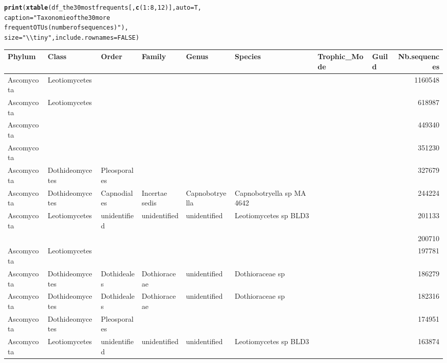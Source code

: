 \documentclass[12pt]{article}\usepackage[]{graphicx}\usepackage[]{color}
\makeatletter
\newcommand{\hlnum}[1]{\textcolor[rgb]{0.686,0.059,0.569}{#1}}%
\newcommand{\hlstr}[1]{\textcolor[rgb]{0.192,0.494,0.8}{#1}}%
\newcommand{\hlopt}[1]{\textcolor[rgb]{0,0,0}{#1}}%
\newcommand{\hlstd}[1]{\textcolor[rgb]{0.345,0.345,0.345}{#1}}%
\newcommand{\hlkwc}[1]{\textcolor[rgb]{0.333,0.667,0.333}{#1}}%
\newcommand{\hlkwd}[1]{\textcolor[rgb]{0.737,0.353,0.396}{\textbf{#1}}}%
\newenvironment{kframe}{%
 \def\at@end@of@kframe{}%
 \ifinner\ifhmode%
  \def\at@end@of@kframe{\end{minipage}}%
  \begin{minipage}{\columnwidth}%
 \fi\fi%
 \def\FrameCommand##1{\hskip\@totalleftmargin \hskip-\fboxsep
 \colorbox{shadecolor}{##1}\hskip-\fboxsep
     \hskip-\linewidth \hskip-\@totalleftmargin \hskip\columnwidth}%
 \MakeFramed {\advance\hsize-\width
   \@totalleftmargin\z@ \linewidth\hsize
   \@setminipage}}%
 {\par\unskip\endMakeFramed%
 \at@end@of@kframe}
\numberwithin{figure}{section}
\makeatother
\begin{document}
\begin{landscape}
\begin{kframe}
\begin{alltt}
\hlkwd{print}\hlstd{(}\hlkwd{xtable}\hlstd{(df_the30mostfrequents[,} \hlkwd{c}\hlstd{(}\hlnum{1}\hlopt{:}\hlnum{8}\hlstd{,} \hlnum{12}\hlstd{)],} \hlkwc{auto} \hlstd{= T,}
             \hlkwc{caption} \hlstd{=} \hlstr{"Taxonomie of the 30 more
             frequent OTUs (number of sequences)"}\hlstd{),}
      \hlkwc{size} \hlstd{=} \hlstr{"\textbackslash{}\textbackslash{}tiny"}\hlstd{,} \hlkwc{include.rownames} \hlstd{=} \hlnum{FALSE}\hlstd{)}
\end{alltt}
\end{kframe}%
\begin{table}[ht]
\centering
\begingroup\tiny
\begin{tabular}{llllllllr}
  \hline
Phylum & Class & Order & Family & Genus & Species & Trophic\_Mode & Guild & Nb.sequences \\ 
  \hline
Ascomycota & Leotiomycetes &  &  &  &  &  &  & 1160548 \\ 
  Ascomycota & Leotiomycetes &  &  &  &  &  &  & 618987 \\ 
  Ascomycota &  &  &  &  &  &  &  & 449340 \\ 
  Ascomycota &  &  &  &  &  &  &  & 351230 \\ 
  Ascomycota & Dothideomycetes & Pleosporales &  &  &  &  &  & 327679 \\ 
  Ascomycota & Dothideomycetes & Capnodiales & Incertae sedis & Capnobotryella & Capnobotryella sp MA 4642 &  &  & 244224 \\ 
  Ascomycota & Leotiomycetes & unidentified & unidentified & unidentified & Leotiomycetes sp BLD3 &  &  & 201133 \\ 
   &  &  &  &  &  &  &  & 200710 \\ 
  Ascomycota & Leotiomycetes &  &  &  &  &  &  & 197781 \\ 
  Ascomycota & Dothideomycetes & Dothideales & Dothioraceae & unidentified & Dothioraceae sp &  &  & 186279 \\ 
  Ascomycota & Dothideomycetes & Dothideales & Dothioraceae & unidentified & Dothioraceae sp &  &  & 182316 \\ 
  Ascomycota & Dothideomycetes & Pleosporales &  &  &  &  &  & 174951 \\ 
  Ascomycota & Leotiomycetes & unidentified & unidentified & unidentified & Leotiomycetes sp BLD3 &  &  & 163874 \\ 

\end{tabular}
\end{table}
\end{landscape}
\end{document}
